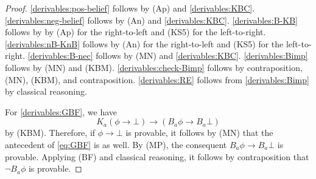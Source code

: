\documentclass[12pt]{article}
\theoremstyle{definition}
\begin{document}
\begin{proof}
  \ref{derivables:pos-belief} follows by (Ap) and \ref{derivables:KBC}.
  \ref{derivables:neg-belief} follows by (An) and \ref{derivables:KBC}.
  \ref{derivables:B-KB} follows by by (Ap) for the right-to-left and (KS5) for the left-to-right.
  \ref{derivables:nB-KnB} follows by (An) for the right-to-left and (KS5) for the left-to-right.
  \ref{derivables:B-nec} follows by (MN) and \ref{derivables:KBC}.
  \ref{derivables:Bimp} follows by (MN) and (KBM).
  \ref{derivables:check-Bimp} follows by contraposition, (MN), (KBM), and contraposition.
  \ref{derivables:RE} follows from \ref{derivables:Bimp} by classical reasoning.

  For \ref{derivables:GBF}, we have
  \begin{equation}
    K_a(\phi\to\bot)\to(B_a\phi\to B_a\bot)
    \label{eq:GBF}
  \end{equation}
  by (KBM).  Therefore, if $\phi\to\bot$ is provable, it follows by
  (MN) that the antecedent of \eqref{eq:GBF} is as well.  By (MP), the
  consequent $B_a\phi\to B_a\bot$ is provable.  Applying (BF) and
  classical reasoning, it follows by contraposition that $\lnot
  B_a\phi$ is provable.
\end{proof}
\end{document}
